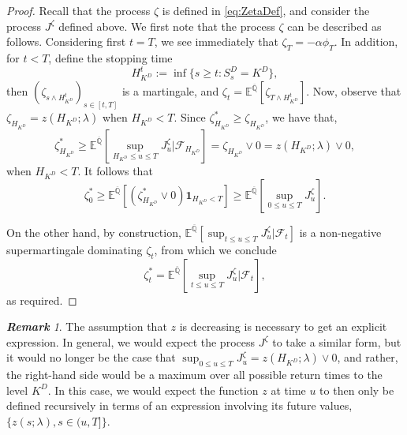 \documentclass[a4paper]{amsart}
\theoremstyle{definition}
\theoremstyle{remark}
\newtheorem{remark}[theorem]{\textbf{Remark}}
\numberwithin{equation}{section}
\newcommand{\E}{\mathbb{E}}
\newcommand{\Fc}{\mathcal{F}}
\newcommand{\ind}{\boldsymbol{1}}
\newcommand{\Ebq}[1]{\E^{\bQ}\left[#1\right]}
\newcommand{\ol}{\overline}
\newcommand{\bQ}{\ol{\mathbb{Q}}}
\begin{document}
\begin{proof}
  
 Recall that the process $\zeta$ is defined in \eqref{eq:ZetaDef}, and   consider the process $J^\zeta$ defined above.
We first note that the process $\zeta$ can be described as follows.  Considering first $t=T$, we see immediately that $\zeta_T = - \alpha\phi_T$. In addition, for $t < T$, define  the  stopping time
\begin{equation}\label{def:stoppingtime}
H_{K^D}^t := \inf \{s \ge t: S_s^D = K^D\},
\end{equation}
then $(\zeta_{s \wedge H_{K^D}^t})_{s \in [t,T]}$ is a martingale, and $\zeta_t = \Ebq{\zeta_{T \wedge H_{K^D}^t}}$. 
Now, observe that $\zeta_{H_{K^D}} = z(H_{K^D}; \lambda)$ when $H_{K^D} < T$. 
Since $\zeta^*_{H_{K^D}} \ge \zeta_{H_{K^D}}$, we have that, 
  $$\zeta^*_{H_{K^D}} \ge \Ebq{\sup_{{H_{K^D}} \le u \le T} J_u^\zeta | \Fc_{H_{K^D}}} = \zeta_{{H_{K^D}}} \vee 0 =z(H_{K^D};\lambda)\vee 0, 
  $$
when $H_{K^D} < T$.  It follows that 
   $$\zeta^*_0 \ge \Ebq{\left(\zeta^*_{H_{K^D}}\vee 0 \right)\ind_{H_{K^D} < T}} \ge \Ebq{\sup_{0\le u \le T} J_u^\zeta}.$$
 
    On the other hand, by construction, $\Ebq{\sup_{t \le u \le T} J_u^\zeta | \Fc_t}$ is a non-negative supermartingale dominating $\zeta_t$, from which we conclude
    \[
      \zeta_t^* = \Ebq{\sup_{t \le u \le T} J_u^\zeta | \Fc_t},
    \]
    as required.

  


\end{proof} 

\begin{remark} The assumption that $z$ is decreasing is necessary to get an explicit expression. In general, we would expect the process $J^\zeta$ to take a similar form, but it would no longer be the case that $\sup_{0 \le u \le T} J_u^\zeta = z(H_{K^D}; \lambda) \vee 0$, and rather, the right-hand side would be a maximum over all possible return times to the level $K^D$. In this case, we would expect the function $z$ at time $u$ to then only be defined recursively in terms of an expression involving its future values, $\{z(s; \lambda), s \in (u,T]\}$.
\end{remark}
\end{document}
